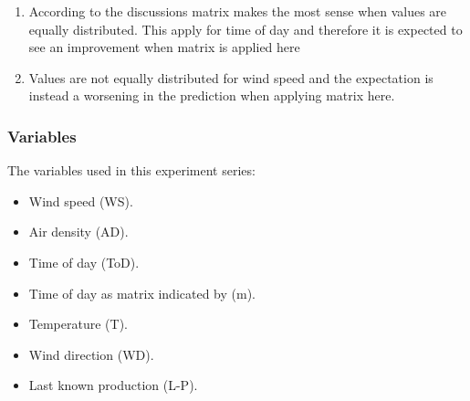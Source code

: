 \begin{enumerate}
\item According to the discussions matrix makes the most sense when values are equally distributed. This apply for time of day and therefore it is expected to see an improvement when matrix is applied here
\item Values are not equally distributed for wind speed and the expectation is instead a worsening in the prediction when applying matrix here.  
\end{enumerate}

\subsubsection{Variables}
The variables used in this experiment series:

\begin{itemize}
\item Wind speed (WS).
\item Air density (AD).
\item Time of day (ToD).
\item Time of day as matrix indicated by (m).
\item Temperature (T).
\item Wind direction (WD).
\item Last known production (L-P).
\end{itemize}

